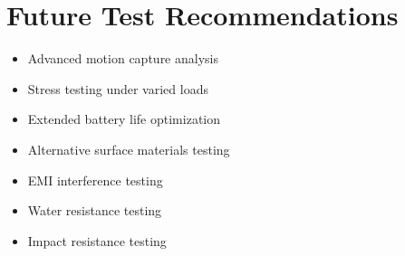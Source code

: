 \documentclass[12pt,a4paper]{report}
\begin{document}
\section{Future Test Recommendations}
\begin{itemize}
\item Advanced motion capture analysis
\item Stress testing under varied loads
\item Extended battery life optimization
\item Alternative surface materials testing
\item EMI interference testing
\item Water resistance testing
\item Impact resistance testing
\end{itemize}

\printbibliography
\end{document}
